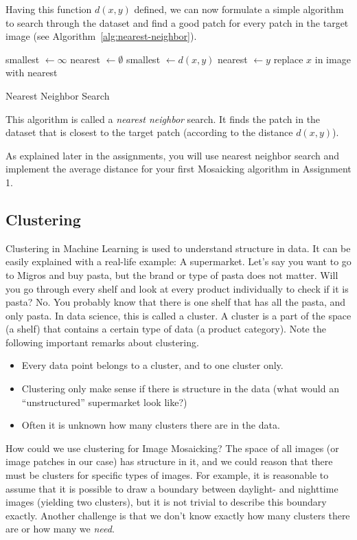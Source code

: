 \documentclass[a4paper]{article}
\begin{document}
		Having this function $d(x, y)$ defined, we can now formulate a simple algorithm to search through the dataset and find a good patch for every patch in the target image (see Algorithm~\ref{alg:nearest-neighbor}). 
		\begin{algorithm}[bt]
			\begin{algorithmic} 
					\STATE smallest $\leftarrow \infty$
					\STATE nearest $\leftarrow \emptyset$
						\STATE smallest $\leftarrow d(x, y)$
						\STATE nearest $\leftarrow y$
						\ENDIF
					\ENDFOR
					\STATE replace $x$ in image with nearest
				\ENDFOR
			\end{algorithmic}
			\caption{Nearest Neighbor Search}
			\label{alg:nearest-neighbor}
		\end{algorithm}
		This algorithm is called a \emph{nearest neighbor} search. 
		It finds the patch in the dataset that is closest to the target patch (according to the distance $d(x,y)$).
		
		As explained later in the assignments, you will use nearest neighbor search and implement the average distance for your first Mosaicking algorithm in Assignment 1.
		
	\subsection{Clustering}
		Clustering in Machine Learning is used to understand structure in data. 
		It can be easily explained with a real-life example: A supermarket.
		Let's say you want to go to Migros and buy pasta, but the brand or type of pasta does not matter.
		Will you go through every shelf and look at every product individually to check if it is pasta? 
		No. 
		You probably know that there is one shelf that has all the pasta, and only pasta.
		In data science, this is called a cluster.
		A cluster is a part of the space (a shelf) that contains a certain type of data (a product category).
		Note the following important remarks about clustering.
		\begin{itemize}
			\item Every data point belongs to a cluster, and to one cluster only.
			\item Clustering only make sense if there is structure in the data (what would an ``unstructured'' supermarket look like?)
			\item Often it is unknown how many clusters there are in the data.
		\end{itemize}
		How could we use clustering for Image Mosaicking?
		The space of all images (or image patches in our case) has structure in it, and we could reason that there must be clusters for specific types of images. For example, it is reasonable to assume that it is possible to draw a boundary between daylight- and nighttime images (yielding two clusters), but it is not trivial to describe this boundary exactly.
		Another challenge is that we don't know exactly how many clusters there are or how many we \emph{need}.
		
\end{document}
